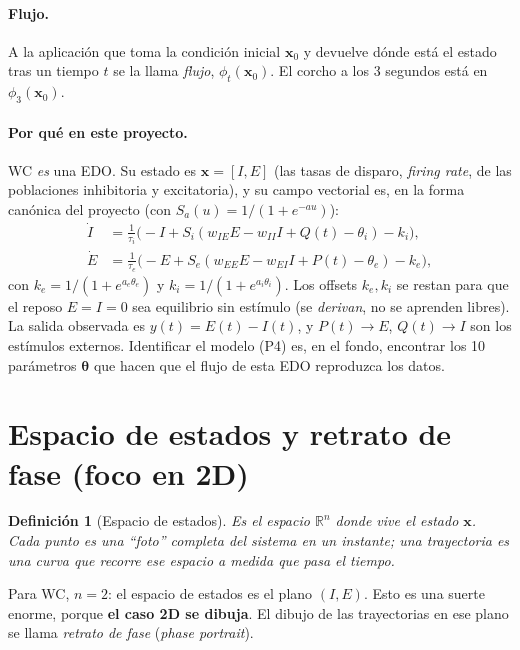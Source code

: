 \documentclass[11pt,a4paper]{article}
\newtheorem{definition}{Definición}
\newcommand{\R}{\mathbb{R}}
\newcommand{\thetavec}{\bm{\theta}}
\begin{document}
\paragraph{Flujo.} A la aplicación que toma la condición inicial $\mathbf{x}_0$ y devuelve dónde está el estado tras un tiempo $t$ se la llama \emph{flujo}, $\phi_t(\mathbf{x}_0)$. El corcho a los 3 segundos está en $\phi_3(\mathbf{x}_0)$.

\paragraph{Por qué en este proyecto.} WC \emph{es} una EDO. Su estado es $\mathbf{x}=[I,E]$ (las tasas de disparo, \emph{firing rate}, de las poblaciones inhibitoria y excitatoria), y su campo vectorial es, en la forma canónica del proyecto (con $S_a(u)=1/(1+e^{-au})$):
\begin{align}
\dot I &= \tfrac{1}{\tau_i}\big(-I + S_i(w_{IE}E - w_{II}I + Q(t) - \theta_i) - k_i\big),\label{eq:wc_I}\\[2pt]
\dot E &= \tfrac{1}{\tau_e}\big(-E + S_e(w_{EE}E - w_{EI}I + P(t) - \theta_e) - k_e\big),\label{eq:wc_E}
\end{align}
con $k_e = 1/(1+e^{a_e\theta_e})$ y $k_i = 1/(1+e^{a_i\theta_i})$. Los offsets $k_e,k_i$ se restan para que el reposo $E=I=0$ sea equilibrio sin estímulo (se \emph{derivan}, no se aprenden libres). La salida observada es $y(t)=E(t)-I(t)$, y $P(t)\!\to\!E$, $Q(t)\!\to\!I$ son los estímulos externos. Identificar el modelo (P4) es, en el fondo, encontrar los 10 parámetros $\thetavec$ que hacen que el flujo de esta EDO reproduzca los datos.

\section{Espacio de estados y retrato de fase (foco en 2D)}

\begin{definition}[Espacio de estados]
Es el espacio $\R^n$ donde vive el estado $\mathbf{x}$. Cada punto es una ``foto'' completa del sistema en un instante; una trayectoria es una curva que recorre ese espacio a medida que pasa el tiempo.
\end{definition}

Para WC, $n=2$: el espacio de estados es el plano $(I,E)$. Esto es una suerte enorme, porque \textbf{el caso 2D se dibuja}. El dibujo de las trayectorias en ese plano se llama \emph{retrato de fase} (\emph{phase portrait}).
\end{document}

